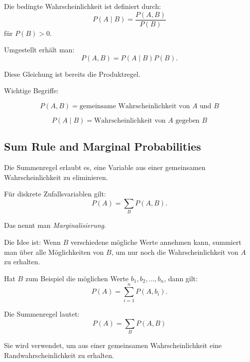 \documentclass[11pt,a4paper]{scrartcl}
\begin{document}
\begin{calculationbox}
    Die bedingte Wahrscheinlichkeit ist definiert durch:
    \[
        P(A \mid B)
        =
        \frac{P(A,B)}{P(B)}
    \]
    für \(P(B) > 0\).

    Umgestellt erhält man:
    \[
        P(A,B)
        =
        P(A \mid B)P(B).
    \]

    Diese Gleichung ist bereits die Produktregel.
\end{calculationbox}

\begin{answerbox}
    Wichtige Begriffe:

    \[
        \boxed{
            P(A,B)
            =
            \text{gemeinsame Wahrscheinlichkeit von } A \text{ und } B
        }
    \]

    \[
        \boxed{
            P(A \mid B)
            =
            \text{Wahrscheinlichkeit von } A \text{ gegeben } B
        }
    \]
\end{answerbox}

\subsection{Sum Rule and Marginal Probabilities}

\begin{calculationbox}
    Die Summenregel erlaubt es, eine Variable aus einer gemeinsamen
    Wahrscheinlichkeit zu eliminieren.

    Für diskrete Zufallsvariablen gilt:
    \[
        P(A) = \sum_B P(A,B).
    \]

    Das nennt man \emph{Marginalisierung}.
\end{calculationbox}

\begin{solutionbox}
    Die Idee ist: Wenn \(B\) verschiedene mögliche Werte annehmen kann, summiert
    man über alle Möglichkeiten von \(B\), um nur noch die Wahrscheinlichkeit von
    \(A\) zu erhalten.

    Hat \(B\) zum Beispiel die möglichen Werte \(b_1,b_2,\dots,b_n\), dann gilt:
    \[
        P(A)
        =
        \sum_{i=1}^{n} P(A,b_i).
    \]
\end{solutionbox}

\begin{answerbox}
    Die Summenregel lautet:
    \[
        \boxed{
            P(A) = \sum_B P(A,B)
        }
    \]

    Sie wird verwendet, um aus einer gemeinsamen Wahrscheinlichkeit eine
    Randwahrscheinlichkeit zu erhalten.
\end{answerbox}
\end{document}

